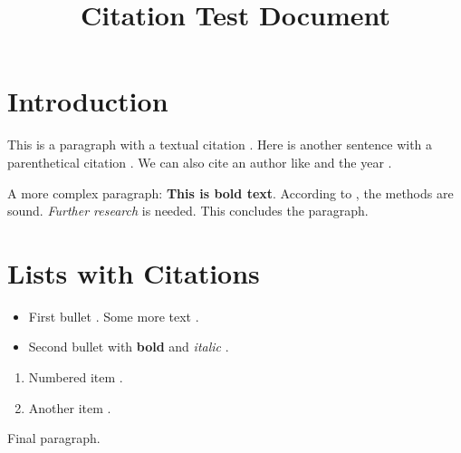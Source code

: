 \title{Citation Test Document}

\section{Introduction}
This is a paragraph with a textual citation \citet[see][p.~19]{romero_water_2021}.
Here is another sentence with a parenthetical citation \citep{cox_fish_2023, cox_fish_2023a}.
We can also cite an author like \citeauthor{bejan_constructural_2005} and the year \citeyearpar[around p.~15]{schioler_roman_1973}.

A more complex paragraph: \textbf{This is bold text}. According to \citet[Chapter 3]{author_2023}, the methods are sound. \textit{Further research} \citep[as discussed by][and others]{doe_2022, smith_2021} is needed. This concludes the paragraph.

\section{Lists with Citations}
\begin{itemize}
    \item First bullet \citep{key_bullet_1}. Some more text \citet[p. 10]{key_bullet_2}.
    \item Second bullet with \textbf{bold} and \textit{italic} \citeauthor{key_bullet_author}.
\end{itemize}

\begin{enumerate}
    \item Numbered item \citep[e.g.][]{key_enum_1, key_enum_2}.
    \item Another item \citeyearpar{key_enum_year}.
\end{enumerate}

Final paragraph.
